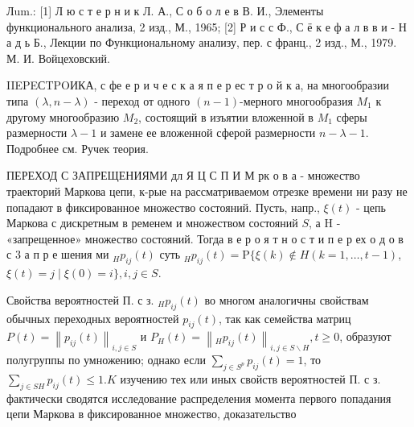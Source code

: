 \documentclass[10pt]{article}
\begin{document}
Лum.: [1] Л ю с т е р н и к Л. А., С о б о л е в В. И., Элементы функционального анализа, 2 изд., М., 1965; [2] Р и с с Ф., С ё к е ф а л в в и - Н а д ь Б., Лекции по Функциональному
анализу, пер. с франц., 2 изд., М., 1979. М. И. Войцеховский.

IIEPEСTPOИКА, с фе е р и ч е с к а я п е р ес т р о й к а, на многообразии типа $(\lambda, n-\lambda)$ - переход от одного $(n-1)$-мерного многообразия $M_{1}$ к другому многообразию $M_{2}$, состоящий в изъятии вложенной в $M_{1}$ сферы размерности $\lambda-1$ и замене ее вложенной сферой размерности $n-\lambda-1$. Подробнее см. Ручек теория.

ПЕРЕХОД С ЗАПРЕЩЕНИЯМИ дл Я Ц С П И М рк о в а - множество траекторий Маркова цепи, к-рые на рассматриваемом отрезке времени ни разу не попадают в фиксированное множество состояний. Пусть, напр., $\xi(t)$ - цепь Маркова с дискретным в ременем и множеством состояний $S$, а $\mathrm{H}$ - «запрещенное» множество состояний. Тогда в е р о я т н о с т и п е р ех о д о в с 3 а п р е шения ми ${ }_{H} p_{i j}(t)$ суть ${ }_{H} p_{i j}(t)=\mathrm{P}\{\xi(k) \notin H(k=1, \ldots, t-1)$, $\xi(t)=j \mid \xi(0)=i\}, i, j \in S$.

Свойства вероятностей П. с з. ${ }_{H} p_{i j}(t)$ во многом аналогичны свойствам обычных переходных вероятностей $p_{i j}(t)$, так как семейства матриц $P(t)=\left\|p_{i j}(t)\right\|_{i, j \in S}$ и $P_{H}(t)=\left\|_{H} p_{i j}(t)\right\|_{i, j \in S \backslash H}, t \geqslant 0$, образуют полугруппы по умножению; однако если $\sum_{j \in S^{p}} p_{i j}(t)=1$, то $\sum_{j \in S H} p_{i j}(t) \leqslant 1 . K$ изучению тех или иных свойств вероятностей П. с з. фактически сводятся исследование распределения момента первого попадания цепи Маркова в фиксированное множество, доказательство
\end{document}
